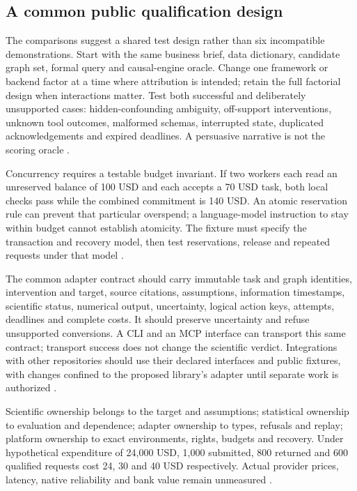 \subsection{A common public qualification design}
The comparisons suggest a shared test design rather than six incompatible
demonstrations. Start with the same business brief, data dictionary,
candidate graph set, formal query and causal-engine oracle. Change one
framework or backend factor at a time where attribution is intended;
retain the full factorial design when interactions matter. Test both
successful and deliberately unsupported cases: hidden-confounding
ambiguity, off-support interventions, unknown tool outcomes, malformed
schemas, interrupted state, duplicated acknowledgements and expired
deadlines. A persuasive narrative is not the scoring oracle
\cite{exec24_framework_contracts}.

Concurrency requires a testable budget invariant. If two workers each
read an unreserved balance of 100 USD and each accepts a 70 USD task,
both local checks pass while the combined commitment is 140 USD.
An atomic reservation rule can prevent that particular overspend;
a language-model instruction to stay within budget cannot establish
atomicity. The fixture must specify the transaction and recovery model,
then test reservations, release and repeated requests under that model
\cite{exec24_framework_contracts}.

The common adapter contract should carry immutable task and graph
identities, intervention and target, source citations, assumptions,
information timestamps, scientific status, numerical output, uncertainty,
logical action keys, attempts, deadlines and complete costs. It should
preserve uncertainty and refuse unsupported conversions. A CLI and an MCP
interface can transport this same contract; transport success does not
change the scientific verdict. Integrations with other repositories should
use their declared interfaces and public fixtures, with changes confined
to the proposed library's adapter until separate work is authorized
\cite{exec24_framework_contracts}.

Scientific ownership belongs to the target and assumptions; statistical
ownership to evaluation and dependence; adapter ownership to types,
refusals and replay; platform ownership to exact environments, rights,
budgets and recovery. Under hypothetical expenditure of 24,000 USD,
1,000 submitted, 800 returned and 600 qualified requests cost 24, 30 and
40 USD respectively. Actual provider prices, latency, native reliability
and bank value remain unmeasured
\cite{exec24_framework_contracts}.

